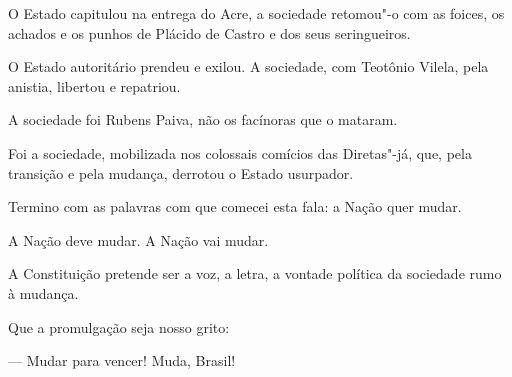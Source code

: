 O Estado capitulou na entrega do Acre, a sociedade retomou"-o com as
foices, os achados e os punhos de Plácido de Castro e dos seus
seringueiros.

O Estado autoritário prendeu e exilou. A sociedade, com Teotônio Vilela,
pela anistia, libertou e repatriou.

A sociedade foi Rubens Paiva, não os facínoras que o mataram.

Foi a sociedade, mobilizada nos colossais comícios das Diretas"-já, que,
pela transição e pela mudança, derrotou o Estado usurpador.

Termino com as palavras com que comecei esta fala: a Nação quer mudar.

A Nação deve mudar. A Nação vai mudar.

A Constituição pretende ser a voz, a letra, a vontade política da
sociedade rumo à mudança.

Que a promulgação seja nosso grito:

--- Mudar para vencer! Muda, Brasil!
